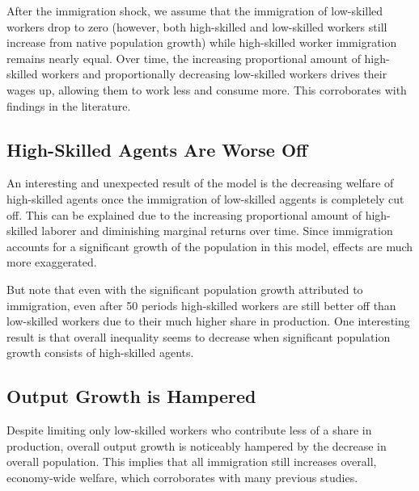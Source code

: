 \documentclass[11pt]{article}
\begin{document}
After the immigration shock, we assume that the immigration of low-skilled workers drop to zero (however, both high-skilled and low-skilled workers still increase from native population growth) while high-skilled worker immigration remains nearly equal. Over time, the increasing proportional amount of high-skilled workers and proportionally decreasing low-skilled workers drives their wages up, allowing them to work less and consume more. This corroborates with findings in the literature.

\subsection{High-Skilled Agents Are Worse Off}

An interesting and unexpected result of the model is the decreasing welfare of high-skilled agents once the immigration of low-skilled aggents is completely cut off. This can be explained due to the increasing proportional amount of high-skilled laborer and diminishing marginal returns over time. Since immigration accounts for a significant growth of the population in this model, effects are much more exaggerated.

But note that even with the significant population growth attributed to immigration, even after 50 periods high-skilled workers are still better off than low-skilled workers due to their much higher share in production. One interesting result is that overall inequality seems to decrease when significant population growth consists of high-skilled agents.

\subsection{Output Growth is Hampered}
Despite limiting only low-skilled workers who contribute less of a share in production, overall output growth is noticeably hampered by the decrease in overall population. This implies that all immigration still increases overall, economy-wide welfare, which corroborates with many previous studies.

\end{document}

